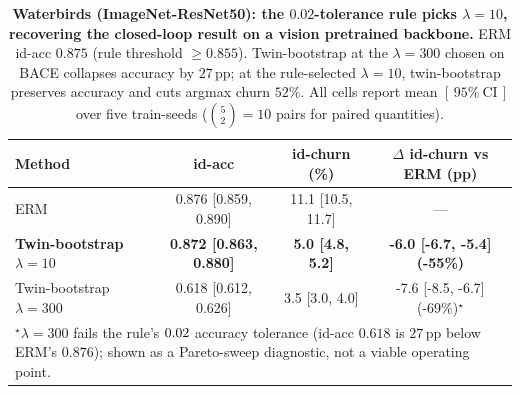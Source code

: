 \begin{table}[h]
\centering
\caption{\textbf{\boldmath Waterbirds (ImageNet-ResNet50): the $0.02$-tolerance rule picks $\lambda{=}10$, recovering the closed-loop result on a vision pretrained backbone.}  ERM id-acc $0.875$ (rule threshold $\geq 0.855$).  Twin-bootstrap at the $\lambda{=}300$ chosen on BACE collapses accuracy by $27$\,pp; at the rule-selected $\lambda{=}10$, twin-bootstrap preserves accuracy and cuts argmax churn $52\%$.  All cells report mean $[\,95\%\ \text{CI}\,]$ over five train-seeds ($\binom{5}{2}{=}10$ pairs for paired quantities).}
\label{tab:waterbirds_lambda}
\small
\begin{tabular}{lccc}
\toprule
Method & id-acc & id-churn (\%) & $\Delta$ id-churn vs ERM (pp) \\
\midrule
ERM & 0.876 [0.859, 0.890] & 11.1 [10.5, 11.7] & --- \\
\textbf{Twin-bootstrap $\lambda{=}10$} & \textbf{0.872 [0.863, 0.880]} & \textbf{5.0 [4.8, 5.2]} & \textbf{-6.0 [-6.7, -5.4] (-55\%)} \\
Twin-bootstrap $\lambda{=}300$ & 0.618 [0.612, 0.626] & 3.5 [3.0, 4.0] & -7.6 [-8.5, -6.7] (-69\%)$^{\star}$ \\
\bottomrule
\multicolumn{4}{l}{\footnotesize $^{\star}$$\lambda{=}300$ fails the rule's $0.02$ accuracy tolerance (id-acc $0.618$ is $27$\,pp below ERM's $0.876$); shown as a Pareto-sweep diagnostic, not a viable operating point.}
\end{tabular}
\end{table}
